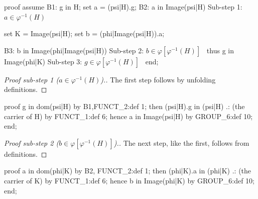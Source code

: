 \nwenddocs{}\endmoddef\nwstartdeflinemarkup{}\nwenddeflinemarkup
proof
  assume B1: g in H;
  set a = (psi|H).g;
  B2: a in Image(psi|H)
  \LA{}Sub-step 1: $a\in\varphi^{-1}(H)$~{\nwtagstyle{}}\RA{}

  set K = Image(psi|H);
  set b = (phi|Image(psi|H)).a;

  B3: b in Image(phi|Image(psi|H))
  \LA{}Sub-step 2: $b\in\varphi[\varphi^{-1}(H)]$~{\nwtagstyle{}}\RA{}
  thus g in Image(phi|K)
  \LA{}Sub-step 3: $g\in\varphi[\varphi^{-1}(H)]$~{\nwtagstyle{}}\RA{}
end;
\nwendcode{}\nwdocspar

\begin{proof}[Proof sub-step 1 ($a\in\varphi^{-1}(H)$).]
The first step follows by unfolding definitions.
\end{proof}


\nwenddocs{}\endmoddef\nwstartdeflinemarkup{}\nwenddeflinemarkup
proof
  g in dom(psi|H) by B1,FUNCT_2:def 1;
  then (psi|H).g in (psi|H) .: (the carrier of H) by FUNCT_1:def 6;
  hence a in Image(psi|H) by GROUP_6:def 10;
end;
\nwendcode{}\nwdocspar

\begin{proof}[{Proof sub-step 2 ($b\in\varphi[\varphi^{-1}(H)]$)}.]
The next step, like the first, follows from definitions.
\end{proof}

\nwenddocs{}\endmoddef\nwstartdeflinemarkup{}\nwenddeflinemarkup
proof
  a in dom(phi|K) by B2, FUNCT_2:def 1;
  then (phi|K).a in (phi|K) .: (the carrier of K) by FUNCT_1:def 6;
  hence b in Image(phi|K) by GROUP_6:def 10;
end;
\nwendcode{}\nwdocspar

